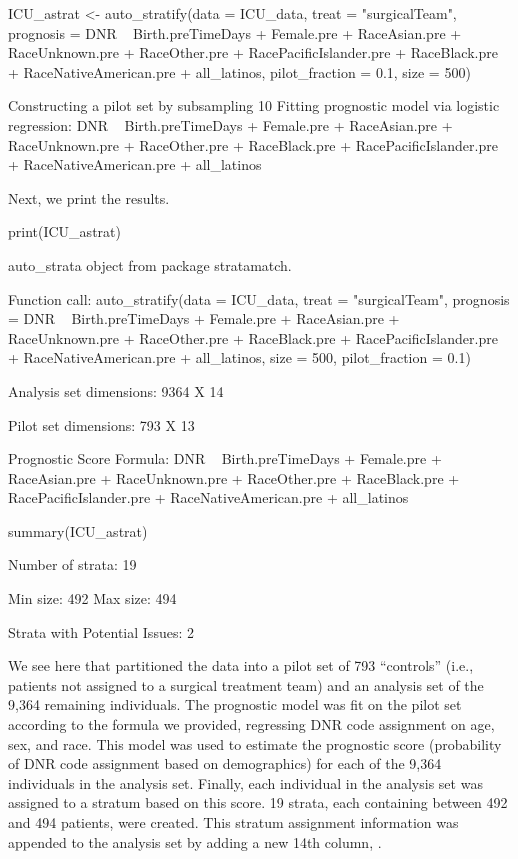 \begin{example}
ICU_astrat <- auto_stratify(data = ICU_data, treat = "surgicalTeam",
    prognosis = DNR ~ Birth.preTimeDays + Female.pre + RaceAsian.pre + 
      RaceUnknown.pre + RaceOther.pre + RacePacificIslander.pre +
      RaceBlack.pre + RaceNativeAmerican.pre + all_latinos,
    pilot_fraction = 0.1, size = 500)  
\end{example}
\begin{example}
Constructing a pilot set by subsampling 10%
Fitting prognostic model via logistic regression: DNR ~ Birth.preTimeDays +
    Female.pre + RaceAsian.pre + RaceUnknown.pre +  RaceOther.pre + 
    RaceBlack.pre + RacePacificIslander.pre + RaceNativeAmerican.pre + 
    all_latinos
\end{example}

Next, we print the results.

\begin{example}
print(ICU_astrat)  
\end{example}
\begin{example}
auto_strata object from package stratamatch.

Function call:
auto_stratify(data = ICU_data, treat = "surgicalTeam", 
    prognosis = DNR ~ Birth.preTimeDays + Female.pre + RaceAsian.pre + 
        RaceUnknown.pre + RaceOther.pre + RaceBlack.pre +
        RacePacificIslander.pre + RaceNativeAmerican.pre + all_latinos,
        size = 500, pilot_fraction = 0.1)

Analysis set dimensions: 9364 X 14

Pilot set dimensions: 793 X 13

Prognostic Score Formula:
DNR ~ Birth.preTimeDays + Female.pre + RaceAsian.pre + RaceUnknown.pre + 
    RaceOther.pre + RaceBlack.pre + RacePacificIslander.pre + 
    RaceNativeAmerican.pre + all_latinos  
\end{example}
\begin{example}
summary(ICU_astrat) 
\end{example}
\begin{example}
Number of strata: 19 

	Min size: 492 	Max size: 494

Strata with Potential Issues: 2
\end{example}

We see here that  partitioned the data into a pilot set of 793 ``controls'' (i.e., patients not assigned to a surgical treatment team) and an analysis set of the 9,364 remaining individuals. The prognostic model was fit on the pilot set according to the formula we provided, regressing DNR code assignment on age, sex, and race. This model was used to estimate the prognostic score (probability of DNR code assignment based on demographics) for each of the 9,364 individuals in the analysis set. Finally, each individual in the analysis set was assigned to a stratum based on this score. 19 strata, each containing between 492 and 494 patients, were created.  This stratum assignment information was appended to the analysis set by adding a new 14th column, .

